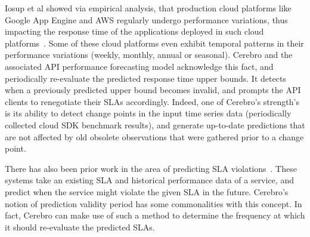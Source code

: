 Iosup et al showed via empirical analysis, that production cloud platforms like Google App Engine and AWS regularly
undergo performance variations, thus impacting the response time of the applications deployed in such
cloud platforms~\cite{5948601}. Some of these cloud platforms even exhibit temporal patterns 
in their performance variations (weekly, monthly, annual or seasonal). Cerebro and the associated API performance
forecasting model acknowledge this fact, and periodically re-evaluate the predicted response time upper bounds.
It detects when a previously predicted upper bound becomes invalid, and prompts the API clients to renegotiate their
SLAs accordingly. Indeed, one of Cerebro's strength's is its ability to detect change points in the input time series
data (periodically collected cloud SDK benchmark results), and generate up-to-date predictions that are not 
affected by old obsolete observations that were gathered prior to a change point.

There has also been prior work in the area of predicting 
SLA violations~\cite{Leitner10,6976585,Duan:2006:PIP:1142473.1142582}. 
These systems take an existing SLA and historical performance data of a service, and predict when the 
service might violate the given SLA in the future. 
Cerebro's notion of prediction validity period has some commonalities with this concept. In fact, Cerebro
can make use of such a method to determine the frequency at which it should re-evaluate the predicted
SLAs.
